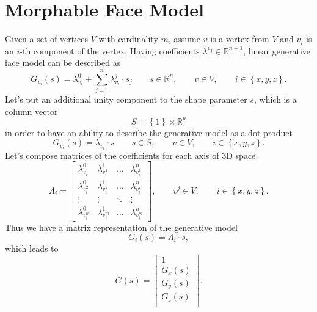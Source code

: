 \section{Morphable Face Model}

Given a set of vertices $V$ with cardinality $m$,
assume $v$ is a vertex from $V$
and $v_i$ is an $i$-th component of the vertex.
Having coefficients $\lambda^{v_j} \in \mathbb{R}^{n + 1}$,
linear generative face model can be described as
\begin{equation*}
  G_{v_i}\left( s \right)
  = \lambda^0_{v_i} + \sum_{j = 1}^{n} \lambda^j_{v_i} \cdot s_j
  \qquad s \in \mathbb{R}^n,
  \qquad v \in V,
  \qquad i \in \left\{ x, y, z \right\}.
\end{equation*}
Let's put an additional unity component to the shape parameter $s$,
which is a column vector
\begin{equation*}
  S = \left\{ 1 \right\} \times \mathbb{R}^n
\end{equation*}
in order to have an ability to describe
the generative model as a dot product
\begin{equation*}
  G_{v_i}\left( s \right)
  = \lambda_{v_i} \cdot s
  \qquad s \in S,
  \qquad v \in V,
  \qquad i \in \left\{ x, y, z \right\}.
\end{equation*}
Let's compose matrices of the coefficients for each axis of 3D space
\begin{equation*}
  \Lambda_i = \begin{bmatrix}
    \lambda^0_{v_i^1} & \lambda^1_{v_i^1} & \dots  & \lambda^n_{v_i^1} \\
    \lambda^0_{v_i^2} & \lambda^1_{v_i^2} & \dots  & \lambda^n_{v_i^2} \\
    \vdots            & \vdots            & \ddots & \vdots            \\
    \lambda^0_{v_i^m} & \lambda^1_{v_i^m} & \dots  & \lambda^n_{v_i^m}
  \end{bmatrix},
  \qquad v^j \in V,
  \qquad i \in \left\{ x, y, z \right\}.
\end{equation*}
Thus we have a matrix representation of the generative model
\begin{equation*}
  G_i\left( s \right) = \Lambda_i \cdot s,
\end{equation*}
which leads to
\begin{equation*}
  G\left( s \right)
  = \begin{bmatrix}
        1 \\
        G_x\left( s \right) \\
        G_y\left( s \right) \\
        G_z\left( s \right) \\
    \end{bmatrix}.
\end{equation*}
